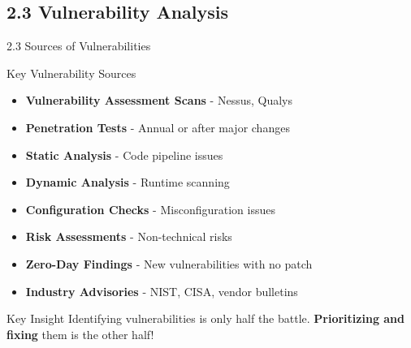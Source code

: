 \documentclass[9pt]{beamer}  %
\begin{document}
	\subsection{2.3 Vulnerability Analysis}
	\begin{frame}{2.3 Sources of Vulnerabilities}
		\begin{block}{Key Vulnerability Sources}
			\begin{itemize}
				\item \textbf{Vulnerability Assessment Scans} - Nessus, Qualys
				\item \textbf{Penetration Tests} - Annual or after major changes
				\item \textbf{Static Analysis} - Code pipeline issues
				\item \textbf{Dynamic Analysis} - Runtime scanning
				\item \textbf{Configuration Checks} - Misconfiguration issues
				\item \textbf{Risk Assessments} - Non-technical risks
				\item \textbf{Zero-Day Findings} - New vulnerabilities with no patch
				\item \textbf{Industry Advisories} - NIST, CISA, vendor bulletins
			\end{itemize}
		\end{block}
		
		\begin{exampleblock}{Key Insight}
			Identifying vulnerabilities is only half the battle. \textbf{Prioritizing and fixing} them is the other half!
		\end{exampleblock}
	\end{frame}
	
\end{document}
